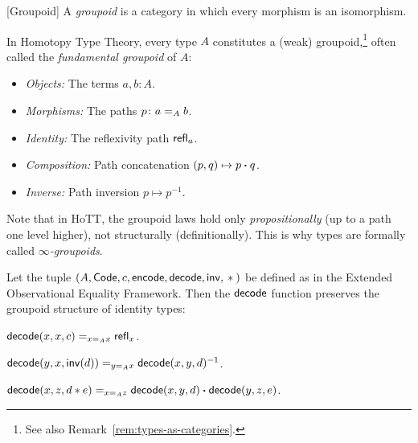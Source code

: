 \begin{defn}{[Groupoid]}
    A \textsl{groupoid} is a category in which every morphism is an isomorphism. 
\end{defn}

\begin{rem}
    In Homotopy Type Theory, every type $A$ constitutes a (weak) groupoid,\footnote{See also Remark~\ref{rem:types-as-categories}.} often called the \textsl{fundamental groupoid} of $A$:
    \begin{itemize}
        \item \textit{Objects:} The terms $a, b \colon A$.
        \item \textit{Morphisms:} The paths $p\colon a\eq Ab$.
        \item \textit{Identity:} The reflexivity path $\mathsf{refl}_a$.
        \item \textit{Composition:} Path concatenation $(p,q)\mapsto p\mathbin{\boldsymbol{\cdot}} q$.
        \item \textit{Inverse:} Path inversion $p\mapsto p^{-1}$.
    \end{itemize}
    Note that in HoTT, the groupoid laws hold only \textit{propositionally} (up to a path one level higher), not structurally (definitionally). This is why types are formally called \textsl{$\infty$-groupoids}.
\end{rem}

\begin{thm}\label{thm:extended-framework}
    Let the tuple\/ $(A,\mathsf{Code}, c,\mathsf{encode}, \mathsf{decode}, \mathsf{inv}, {}\mathbin\ast{})$ be defined as in the\/ {\upshape Extended Observational Equality Framework}. Then the\/ $\mathsf{decode}$ function preserves the groupoid structure of identity types:
    \begin{description}[font=\normalfont\itshape]
        \item[Reflexivity:] $\mathsf{decode}(x, x, c)\mathrel{=_{x\mathrel{=_{A}}x}}\mathsf{refl}_x$.
        \item[Symmetry:] $\mathsf{decode}(y,x,\mathsf{inv}(d)) \mathrel{=_{y\mathrel{=_{A}}x}}\mathsf{decode}(x,y,d)^{-1}$.
        \item[Transitivity:] $\mathsf{decode}(x,z,d\mathbin\ast e)\mathrel{=_{x\mathrel{=_{A}}z}}\mathsf{decode}(x,y,d) \mathbin{\boldsymbol{\cdot}} \mathsf{decode}(y, z, e)$.
    \end{description}
\end{thm}


